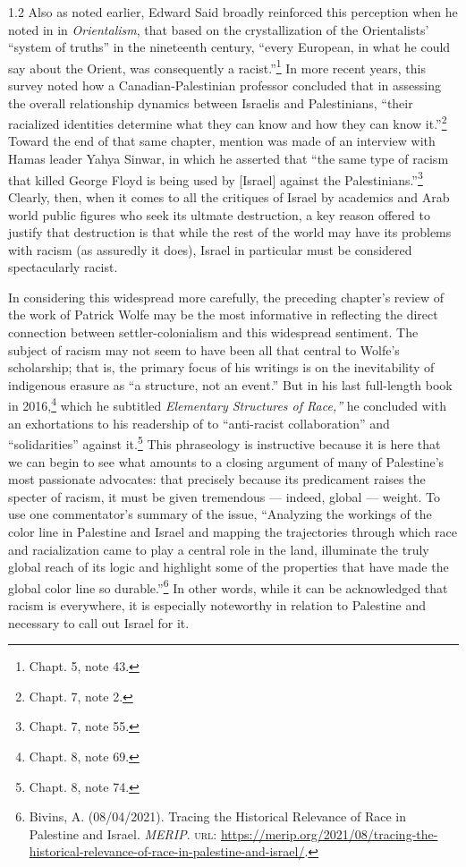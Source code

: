\documentclass[../unravbook.tex]{subfiles}
\begin{document}
\begin{spacing}{1.2}
Also as noted earlier, Edward Said broadly reinforced this perception when he noted in in \textit{Orientalism}, that based on the crystallization of the Orientalists' ``system of truths'' in the nineteenth century, ``every European, in what he could say about the Orient, was consequently a racist.''\footnote{Chapt. 5, note 43.} In more recent years, this survey noted how a Canadian-Palestinian professor concluded that in assessing the overall relationship dynamics between Israelis and Palestinians, ``their racialized identities determine what they can know and how they can know it.''\footnote{Chapt. 7, note 2.} Toward the end of that same chapter, mention was made of an interview with Hamas leader Yahya Sinwar, in which he asserted that ``the same type of racism that killed George Floyd is being used by [Israel] against the Palestinians.''\footnote{Chapt. 7, note 55.} Clearly, then, when it comes to all the critiques of Israel by academics and Arab world public figures who seek its ultmate destruction, a key reason offered to justify that destruction is that while the rest of the world may have its problems with racism (as assuredly it does), Israel in particular must be considered spectacularly racist.  

In considering this widespread more carefully, the preceding chapter's review of the work of Patrick Wolfe may be the most informative in reflecting the direct connection between settler-colonialism and this widespread sentiment. The subject of racism may not seem to have been all that central to Wolfe's scholarship; that is, the primary focus of his writings is on the inevitability of indigenous erasure as ``a structure, not an event.'' But in his last full-length book in 2016,\footnote{Chapt. 8, note 69.} which he subtitled  \textit{Elementary Structures of Race,''} he concluded with an exhortations to his readership of to ``anti-racist collaboration'' and ``solidarities'' against it.\footnote{Chapt. 8, note 74.} This phraseology is instructive because it is here that we can begin to see what amounts to a closing argument of many of Palestine's most passionate advocates: that precisely because its predicament raises the specter of racism, it must be given tremendous --- indeed, global --- weight. To use one commentator's summary of the issue, ``Analyzing the workings of the color line in Palestine and Israel and mapping the trajectories through which race and racialization came to play a central role in the land, illuminate the truly global reach of its logic and highlight some of the properties that have made the global color line so durable.''\footnote{Bivins, A. (08/04/2021). Tracing the Historical Relevance of Race in Palestine and Israel. \textit{MERIP}. \textsc{url: } \url{https://merip.org/2021/08/tracing-the-historical-relevance-of-race-in-palestine-and-israel/}.} In other words, while it can be acknowledged that racism is everywhere, it is especially noteworthy in relation to Palestine and necessary to call out Israel for it.    


\end{spacing}
\end{document}
